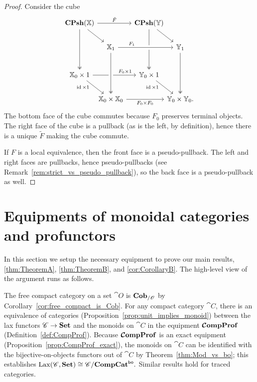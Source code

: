 \documentclass[12pt,oneside,article,draft]{memoir}
\begin{document}
\begin{proof}
   Consider the cube
   \begin{equation*}
      \begin{tikzcd}[row sep={40,between origins}, column sep={55,between origins}]
         \CPsh(\dcat{X}) \ar[rr,"\tilde{F}"] \ar[dr] \ar[dd,two heads]
         &[-10] & \CPsh(\dcat{Y}) \ar[dd,two heads] \ar[dr] &[-10] \\[-5]
         & \dcat{X}_1 \ar[rr,crossing over,"F_1" near start]
            && \dcat{Y}_1 \ar[dd,two heads] \\
         \dcat{X}_0\times 1 \ar[rr,"F_0\times 1" pos=.75]
               \ar[dr,"\id\times 1"' {pos=.25,inner sep=2pt}]
            && \dcat{Y}_0\times 1 \ar[dr,"\id\times 1"' {pos=.25,inner sep=2pt}] & \\[-5]
         & \dcat{X}_0\times\dcat{X}_0 \ar[rr,"F_0\times F_0"']
               \ar[from=uu,crossing over,two heads]
            && \dcat{Y}_0\times\dcat{Y}_0.
      \end{tikzcd}
   \end{equation*}
   The bottom face of the cube commutes because $F_0$ preserves terminal objects. The right face of
   the cube is a pullback (as is the left, by definition), hence there is a unique $\tilde{F}$
   making the cube commute.

   If $F$ is a local equivalence, then the front face is a pseudo-pullback. The left and right faces
   are pullbacks, hence pseudo-pullbacks (see Remark~\ref{rem:strict_vs_pseudo_pullback}), so the
   back face is a pseudo-pullback as well.
\end{proof}

\chapter{Equipments of monoidal categories and profunctors}\label{sec:equipments_monoidal_profunctors}

In this section we setup the necessary equipment to prove our main results, \ref{thm:TheoremA},
\ref{thm:TheoremB}, and \ref{cor:CorollaryB}. The high-level view of the argument runs as follows.

The free compact category on a set $\cat{O}$ is $\mathbf{Cob}_{/\mathscr{O}}$ by
Corollary~\ref{cor:free_compact_is_Cob}. For any compact category $\cat{C}$, there is an equivalence
of categories (Proposition~\ref{prop:unit_implies_monoid}) between the lax functors $\mathscr{C}\to\mathbf{Set}$
and the monoids on $\cat{C}$ in the equipment $\bm{\mathcal{C}}\mathbf{ompProf}$ (Definition~\ref{def:CompProf}). Because
$\bm{\mathcal{C}}\mathbf{ompProf}$ is an exact equipment (Proposition~\ref{prop:CompProf_exact}), the monoids on $\cat{C}$
can be identified with the bijective-on-objects functors out of $\cat{C}$ by
Theorem~\ref{thm:Mod_vs_bo}; this establishes $\operatorname{Lax}(\mathscr{C},\mathbf{Set})\cong\mathscr{C}/\mathbf{CompCat}^{\mathsf{bo}}.$
Similar results hold for traced categories. 
\end{document}
